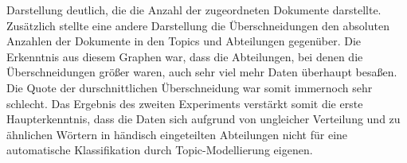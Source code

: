 \documentclass[german,version-2020-11]{uzl-thesis}
\begin{document}
Darstellung deutlich, die die Anzahl der zugeordneten Dokumente darstellte. Zusätzlich stellte eine andere Darstellung die Überschneidungen den absoluten Anzahlen der Dokumente in den Topics und Abteilungen gegenüber. Die Erkenntnis aus diesem Graphen war, dass die Abteilungen, bei denen die Überschneidungen größer waren, auch sehr viel mehr Daten überhaupt besaßen. Die Quote der durschnittlichen Überschneidung war somit immernoch sehr schlecht. Das Ergebnis des zweiten Experiments verstärkt somit die erste Haupterkenntnis, dass die Daten sich aufgrund von ungleicher Verteilung und zu ähnlichen Wörtern in händisch eingeteilten Abteilungen nicht für eine automatische Klassifikation durch Topic-Modellierung eigenen.



%






%
\end{document}
